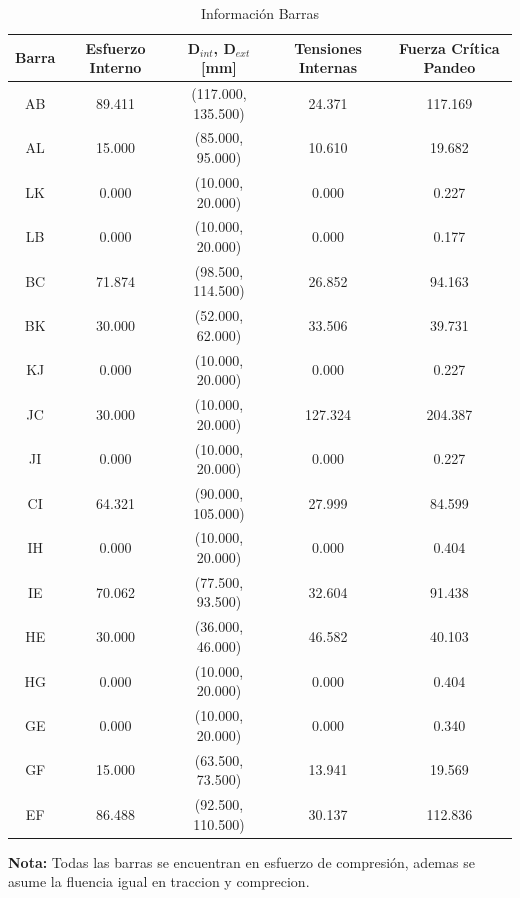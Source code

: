 \begin{table}[H]
    \centering
    \begin{tabular}{|c|c|c|c|c|}
    \hline
    \textbf{Barra} & \textbf{Esfuerzo Interno} & \textbf{D$_{int}$, D$_{ext}$ [mm]} & \textbf{Tensiones Internas} & \textbf{Fuerza Crítica Pandeo} \\ 
    \hline
    AB & 89.411 & (117.000, 135.500) & 24.371 & 117.169 \\ 
    AL & 15.000 & (85.000, 95.000) & 10.610 & 19.682 \\ 
    LK & 0.000 & (10.000, 20.000) & 0.000 & 0.227 \\ 
    LB & 0.000 & (10.000, 20.000) & 0.000 & 0.177 \\ 
    BC & 71.874 & (98.500, 114.500) & 26.852 & 94.163 \\ 
    BK & 30.000 & (52.000, 62.000) & 33.506 & 39.731 \\ 
    KJ & 0.000 & (10.000, 20.000) & 0.000 & 0.227 \\ 
    JC & 30.000 & (10.000, 20.000) & 127.324 & 204.387 \\ 
    JI & 0.000 & (10.000, 20.000) & 0.000 & 0.227 \\ 
    CI & 64.321 & (90.000, 105.000) & 27.999 & 84.599 \\ 
    IH & 0.000 & (10.000, 20.000) & 0.000 & 0.404 \\ 
    IE & 70.062 & (77.500, 93.500) & 32.604 & 91.438 \\ 
    HE & 30.000 & (36.000, 46.000) & 46.582 & 40.103 \\ 
    HG & 0.000 & (10.000, 20.000) & 0.000 & 0.404 \\ 
    GE & 0.000 & (10.000, 20.000) & 0.000 & 0.340 \\ 
    GF & 15.000 & (63.500, 73.500) & 13.941 & 19.569 \\ 
    EF & 86.488 & (92.500, 110.500) & 30.137 & 112.836 \\ 
    \hline
    \end{tabular}
    \caption{Información Barras}
\end{table}

\textbf{Nota:} Todas las barras se encuentran en esfuerzo de compresión, ademas se asume la fluencia igual en traccion y comprecion.

